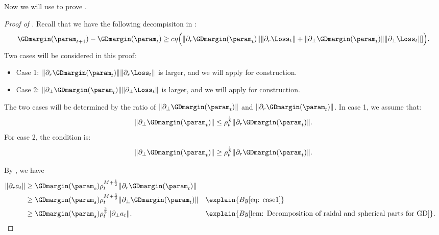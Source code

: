 Now we will use   to prove .

\begin{proof}
    [Proof of ]
    
    Recall that we have the following decompisiton in : 
    \[
        \GDmargin (\param_{t+1}) - \GDmargin (\param_t) \ge c\eta \Big(\| \partial_r \GDmargin(\param_t) \| \| \partial_r \Loss_t\| + \| \partial_\perp \GDmargin (\param_t) \| \| \partial_\perp \Loss_t\| ]\Big).
    \]
    Two cases will be considered in this proof: 
    \begin{itemize}
        \item Case 1: $\| \partial_r \GDmargin (\param_t) \| \| \partial_r \Loss_t\|$ is larger, and we will apply  for construction. 
        \item Case 2: $\| \partial_\perp \GDmargin (\param_t) \| \| \partial_\perp \Loss_t\|$ is larger, and we will apply  for construction.
    \end{itemize}
    The two cases will be determined by the ratio of $\| \partial_\perp \GDmargin(\param_t) \|$ and $\| \partial_r \GDmargin(\param_t) \|$. In case 1, we assume that: 
    \begin{equation}
    \label{eq: case1-GD}
        \| \partial_\perp \GDmargin (\param_t) \| \le \rho_t^{\frac{1}{8}} \| \partial_r \GDmargin (\param_t) \|. 
    \end{equation}
    For case 2, the condition is: 
    \begin{equation}
    \label{eq: case2-GD}
    \| \partial_\perp \GDmargin (\param_t) \| \ge  \rho_t^{\frac{1}{8}} \| \partial_r \GDmargin (\param_t) \|. 
    \end{equation}
    
     By , we have 
    \begin{align}
        \label{eq: ratio-a}
        \| \partial_r a_t \| 
        &\ge \GDmargin(\param_s) \rho_t^{M+\frac{1}{2}} \| \partial_r \GDmargin (\param_t) \|  \notag\\
        &\ge \GDmargin(\param_s) \rho_t^{M + \frac{3}{8}} \| \partial_\perp \GDmargin (\param_t)\| &&\explain{ By \Cref{eq: case1}} \notag \\ 
        &\ge \GDmargin(\param_s) \rho_t^{\frac{3}{8}} \| \partial_\perp a_t\|. &&\explain{ By \Cref{lem: Decomposition of raidal and spherical parts for GD}}. 
    \end{align}
    

\end{proof}
